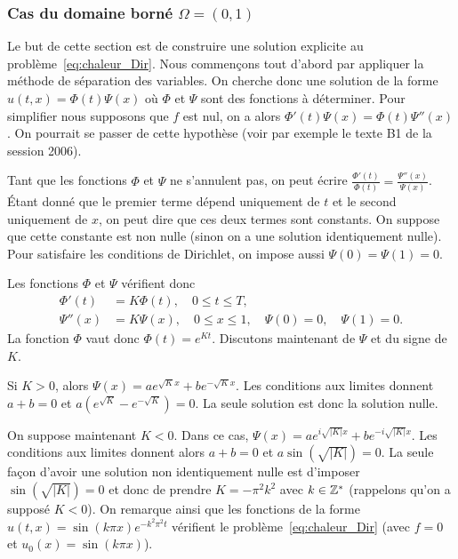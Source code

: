 \documentclass[12pt,a4paper,twoside]{article}
\begin{document}
\subsubsection{Cas du domaine born\'e $\Omega = (0,1)$}
\label{subsubsec:chal_born}

Le but de cette section est de construire une solution explicite
au probl\`eme~\eqref{eq:chaleur_Dir}.
Nous commen\c{c}ons tout d'abord par appliquer la m\'ethode de s\'eparation des variables.
On cherche donc une solution de la forme
$u(t,x) = \Phi(t) \Psi(x)$ o\`u $\Phi$ et $\Psi$ sont des fonctions \`a d\'eterminer.
Pour simplifier nous supposons que $f$ est nul, on a alors $\Phi'(t) \Psi(x) = \Phi(t) \Psi''(x)$.
On pourrait se passer de cette hypoth\`ese (voir par exemple le texte B1 de la session 2006).


Tant que les fonctions $\Phi$ et $\Psi$ ne s'annulent pas, on peut \'ecrire
$\frac{\Phi'(t)}{\Phi(t)} = \frac{\Psi''(x)}{\Psi(x)}$.
\'Etant donn\'e que le premier terme d\'epend uniquement de $t$
et le second uniquement de $x$, on peut dire que ces deux termes sont constants.
On suppose que cette constante est non nulle (sinon on a une solution
identiquement nulle).
Pour satisfaire les conditions de Dirichlet, on impose aussi $\Psi(0) = \Psi(1) = 0$.


Les fonctions $\Phi$ et $\Psi$ v\'erifient donc
\begin{align*}
  \Phi'(t)
  &= K \Phi(t) , \quad 0 \leq t \leq T,
  \\
  \Psi''(x)
  &= K \Psi(x) , \quad 0 \leq x \leq 1, \quad
  \Psi(0)
  = 0 , \quad
  \Psi(1)
  = 0 .
\end{align*}
La fonction $\Phi$ vaut donc $\Phi(t) = e^{K t}$. Discutons maintenant de $\Psi$ et du signe de $K$.

Si $K>0$, alors $\Psi(x) = a e^{\sqrt{K} x} + b e^{- \sqrt{K} x}$.
Les conditions aux limites donnent
$a+b=0$ et $a(e^{\sqrt{K}} - e^{-\sqrt{K}}) = 0$.
La seule solution est donc la solution nulle.


On suppose maintenant $K < 0$.
Dans ce cas, $\Psi(x) = a e^{i\sqrt{|K|} x} + b e^{- i\sqrt{|K|} x}$.
Les conditions aux limites donnent alors $a + b = 0$
et $a \sin(\sqrt{|K|}) = 0$.
La seule fa\c{c}on d'avoir une solution non identiquement nulle
est d'imposer $\sin(\sqrt{|K|}) = 0$ et donc de prendre $K = - \pi^2 k^2$ avec $k \in \mathbb{Z}^*$
(rappelons qu'on a suppos\'e $K<0$).
On remarque ainsi
que les fonctions de la forme $u(t,x) = \sin(k \pi x) e^{-k^2 \pi^2 t}$
v\'erifient le probl\`eme~\eqref{eq:chaleur_Dir} (avec $f = 0$ et $u_0(x) = \sin(k \pi x)$).
\end{document}
